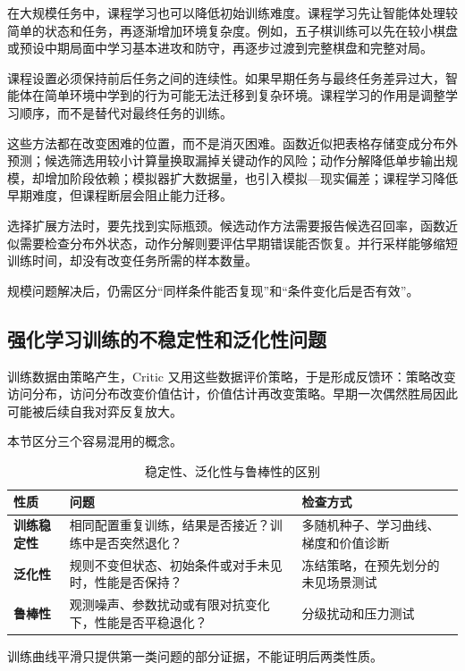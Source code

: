 \documentclass[UTF8,a4paper,zihao=-4,oneside,openany]{ctexbook}
\begin{document}
在大规模任务中，课程学习也可以降低初始训练难度。课程学习先让智能体处理较简单的状态和任务，再逐渐增加环境复杂度。例如，五子棋训练可以先在较小棋盘或预设中期局面中学习基本进攻和防守，再逐步过渡到完整棋盘和完整对局。

课程设置必须保持前后任务之间的连续性。如果早期任务与最终任务差异过大，智能体在简单环境中学到的行为可能无法迁移到复杂环境。课程学习的作用是调整学习顺序，而不是替代对最终任务的训练。

这些方法都在改变困难的位置，而不是消灭困难。函数近似把表格存储变成分布外预测；候选筛选用较小计算量换取漏掉关键动作的风险；动作分解降低单步输出规模，却增加阶段依赖；模拟器扩大数据量，也引入模拟—现实偏差；课程学习降低早期难度，但课程断层会阻止能力迁移。

选择扩展方法时，要先找到实际瓶颈。候选动作方法需要报告候选召回率，函数近似需要检查分布外状态，动作分解则要评估早期错误能否恢复。并行采样能够缩短训练时间，却没有改变任务所需的样本数量。

规模问题解决后，仍需区分“同样条件能否复现”和“条件变化后是否有效”。

\subsection{强化学习训练的不稳定性和泛化性问题}

训练数据由策略产生，Critic 又用这些数据评价策略，于是形成反馈环：策略改变访问分布，访问分布改变价值估计，价值估计再改变策略。早期一次偶然胜局因此可能被后续自我对弈反复放大。

本节区分三个容易混用的概念。

\begin{table}[htbp]
  \centering
  \caption{稳定性、泛化性与鲁棒性的区别}
  \label{tab:stability-generalization-robustness}
  \begin{tabularx}{\linewidth}{>{\bfseries}p{2.5cm}p{4.2cm}X}
    \toprule
    性质 & 问题 & 检查方式 \\
    \midrule
    训练稳定性 & 相同配置重复训练，结果是否接近？训练中是否突然退化？ & 多随机种子、学习曲线、梯度和价值诊断 \\
    泛化性 & 规则不变但状态、初始条件或对手未见时，性能是否保持？ & 冻结策略，在预先划分的未见场景测试 \\
    鲁棒性 & 观测噪声、参数扰动或有限对抗变化下，性能是否平稳退化？ & 分级扰动和压力测试 \\
    \bottomrule
  \end{tabularx}
\end{table}

训练曲线平滑只提供第一类问题的部分证据，不能证明后两类性质。
\end{document}
